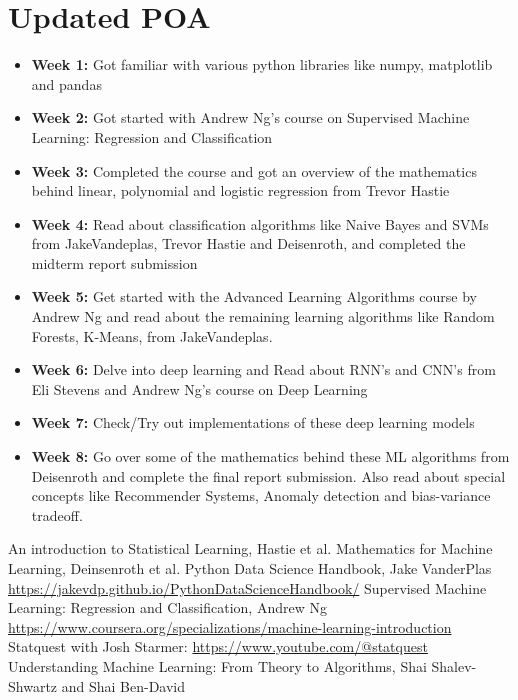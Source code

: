\documentclass[12pt]{article}
\begin{document}
\section{Updated POA}
\begin{itemize}
    \item \textbf{Week 1: }Got familiar with various python libraries like numpy, matplotlib and pandas
    \item \textbf{Week 2: }Got started with Andrew Ng's course on Supervised Machine Learning: Regression and Classification
    \item \textbf{Week 3: }Completed the course and got an overview of the mathematics behind linear, polynomial and logistic regression from Trevor Hastie
    \item \textbf{Week 4: }Read about classification algorithms like Naive Bayes and SVMs from JakeVandeplas, Trevor Hastie and Deisenroth, and completed the midterm report submission
    \item \textbf{Week 5: }Get started with the Advanced Learning Algorithms course by Andrew Ng and read about the remaining learning algorithms like Random Forests, K-Means, from JakeVandeplas.
    \item \textbf{Week 6: }Delve into deep learning and Read about RNN’s and CNN’s from Eli Stevens and Andrew Ng’s course on Deep Learning
    \item \textbf{Week 7: }Check/Try out implementations of these deep learning models
    \item \textbf{Week 8: }Go over some of the mathematics behind these ML algorithms from Deisenroth and complete the final report submission. Also read about special concepts like Recommender Systems, Anomaly detection and bias-variance tradeoff.
\end{itemize}
\newpage
\begin{thebibliography}{9}

An introduction to Statistical Learning, Hastie et al.
Mathematics for Machine Learning, Deinsenroth et al.
Python Data Science Handbook, Jake VanderPlas \url{https://jakevdp.github.io/PythonDataScienceHandbook/}
 Supervised Machine Learning: Regression and Classification, Andrew Ng \url{https://www.coursera.org/specializations/machine-learning-introduction}
Statquest with Josh Starmer: \url{https://www.youtube.com/@statquest}
Understanding Machine Learning: From Theory to Algorithms, Shai Shalev-Shwartz and Shai Ben-David

\end{thebibliography}
\end{document}
